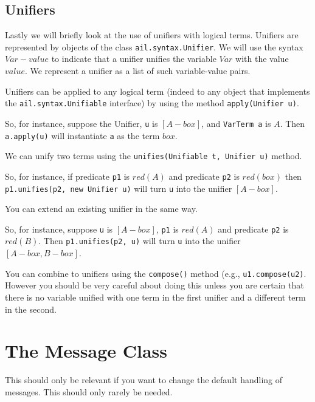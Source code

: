 \subsection{Unifiers}
Lastly we will briefly look at the use of unifiers with logical terms.  Unifiers are represented by objects of the class \texttt{ail.syntax.Unifier}.  We will use the syntax $Var-value$ to indicate that a unifier unifies the variable $Var$ with the value $value$.  We represent a unifier as a list of such variable-value pairs.
\begin{itemize}
\item Unifiers can be applied to any logical term (indeed to any object that implements the \texttt{ail.syntax.Unifiable} interface) by using the method \texttt{apply(Unifier u)}.

So, for instance, suppose the  Unifier, \texttt{u} is $[A-box]$, and \texttt{VarTerm a} is $A$. Then \texttt{a.apply(u)} will instantiate \texttt{a} as the term $box$.
\item We can unify two terms using the \texttt{unifies(Unifiable t, Unifier u)} method.

So, for instance, if predicate \texttt{p1} is $red(A)$ and predicate \texttt{p2} is $red(box)$ then \texttt{p1.unifies(p2, new Unifier u)} will turn \texttt{u} into the unifier $[A-box]$.
\item You can extend an existing unifier in the same way. 

So, for instance, suppose \texttt{u} is $[A-box]$, \texttt{p1} is $red(A)$ and predicate \texttt{p2} is $red(B)$.  Then \texttt{p1.unifies(p2, u)} will turn \texttt{u} into the unifier $[A-box, B-box]$.
\begin{sloppypar}
\item You can combine to unifiers using the \texttt{compose()} method (e.g., \texttt{u1.compose(u2)}.  However you should be very careful about doing this unless you are certain that there is no variable unified with one term in the first unifier and a different term in the second.
\end{sloppypar}
\end{itemize}

\section{The Message Class}
This should only be relevant if you want to change the default handling of messages.  This should only rarely be needed.

